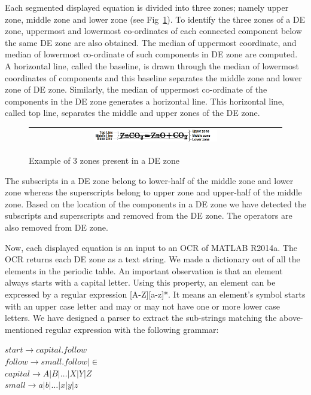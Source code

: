 \documentclass[oneside,a4paper,12pt]{book}
\begin{document}
Each segmented displayed equation is divided into three zones; namely upper zone, middle zone and lower zone (see Fig~\ref{sub_super}).
To identify the three zones of a DE zone, uppermost and lowermost co-ordinates of each connected component below the same DE zone  are also obtained.
The median of uppermost coordinate, and median of lowermost co-ordinate of such components in DE zone are computed.
A horizontal line, called the baseline, is drawn through the median of lowermost coordinates of components
and this baseline separates the middle zone and lower zone of DE zone.
Similarly, the median of uppermost co-ordinate of the components in the DE zone  generates a horizontal line. This horizontal line, called top line, separates the middle and  upper zones of the DE zone.
\begin{figure}[h]\center\footnotesize
\begin{tabular}{|c|}
\hline
 \includegraphics[width=0.5\textwidth]{s_s.png} \\ \hline
 \end{tabular} 
 \caption{Example of 3 zones present in a DE zone}
 \label{sub_super}
\end{figure}


The subscripts in a DE zone belong to lower-half of the middle zone and lower zone whereas the superscripts belong to upper zone and
upper-half of the middle zone. Based on the location of the components in a DE zone we have detected the subscripts and superscripts
and removed from the DE zone. The operators are also removed from DE zone.

Now, each displayed equation is an input to an OCR of MATLAB
R2014a.
The OCR returns each DE zone as a text string.
We made a dictionary out of all the elements in the periodic table. An important observation is that an element always starts with a capital letter. Using this property,
an element can be expressed by a regular expression [A-Z][a-z]*. 
It means an element's symbol
starts with an upper case letter and may or may not have one or more lower case letters. 
We have designed a parser to extract the sub-strings matching the above-mentioned regular expression with the following grammar:\\
\begin{center}
$start \rightarrow capital.follow$\\
$follow \rightarrow small.follow | \in$\\
$capital \rightarrow A|B| \dots |X|Y|Z$\\
$small \rightarrow a|b| \dots |x|y|z$\\
\end{center}
\end{document}
